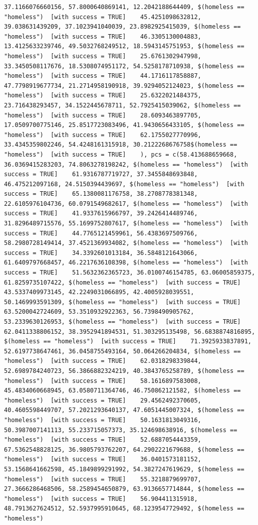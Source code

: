 \documentclass{tufte-book}\usepackage[]{graphicx}\usepackage[]{xcolor}
\makeatletter
\newenvironment{kframe}{%
 \def\at@end@of@kframe{}%
 \ifinner\ifhmode%
  \def\at@end@of@kframe{\end{minipage}}%
  \begin{minipage}{\columnwidth}%
 \fi\fi%
 \def\FrameCommand##1{\hskip\@totalleftmargin \hskip-\fboxsep
 \colorbox{shadecolor}{##1}\hskip-\fboxsep
     \hskip-\linewidth \hskip-\@totalleftmargin \hskip\columnwidth}%
 \MakeFramed {\advance\hsize-\width
   \@totalleftmargin\z@ \linewidth\hsize
   \@setminipage}}%
 {\par\unskip\endMakeFramed%
 \at@end@of@kframe}
\newenvironment{knitrout}{}{} %
\makeatother
\begin{document}
\begin{knitrout}
\begin{kframe}
\begin{verbatim}
37.1166076660156, 57.8000640869141, 12.2042188644409, $(homeless == "homeless")  [with success = TRUE]    45.4251098632812, 39.038631439209, 37.1023941040039, 23.8982925415039, $(homeless == "homeless")  [with success = TRUE]    46.3305130004883, 13.4125633239746, 49.5032768249512, 18.5943145751953, $(homeless == "homeless")  [with success = TRUE]    25.6761302947998, 33.3450508117676, 18.5308074951172, 54.5258178710938, $(homeless == "homeless")  [with success = TRUE]    44.1716117858887, 47.7798919677734, 21.2714958190918, 39.9294052124023, $(homeless == "homeless")  [with success = TRUE]    25.6322021484375, 23.716438293457, 34.1522445678711, 52.7925415039062, $(homeless == "homeless")  [with success = TRUE]    28.6093463897705, 17.0509700775146, 25.8517723083496, 41.9430656433105, $(homeless == "homeless")  [with success = TRUE]    62.1755027770996, 33.4345359802246, 54.4248161315918, 30.2122268676758$(homeless == "homeless")  [with success = TRUE]    ), pcs = c(58.413688659668, 36.0369415283203, 74.8063278198242, $(homeless == "homeless")  [with success = TRUE]    61.9316787719727, 37.3455848693848, 46.475212097168, 24.5150394439697, $(homeless == "homeless")  [with success = TRUE]    65.1380081176758, 38.2708778381348, 22.6105976104736, 60.0791549682617, $(homeless == "homeless")  [with success = TRUE]    41.9337615966797, 39.2426414489746, 31.8296489715576, 55.1699752807617, $(homeless == "homeless")  [with success = TRUE]    44.7765121459961, 56.4383697509766, 58.2980728149414, 37.4521369934082, $(homeless == "homeless")  [with success = TRUE]    34.3392601013184, 36.5848121643066, 61.6409797668457, 46.2217636108398, $(homeless == "homeless")  [with success = TRUE]    51.5632362365723, 36.0100746154785, 63.06005859375, 61.8259735107422, $(homeless == "homeless")  [with success = TRUE]    43.5337409973145, 42.2249031066895, 42.4005928039551, 50.1469993591309, $(homeless == "homeless")  [with success = TRUE]    63.5200042724609, 53.3510932922363, 56.7398490905762, 53.2339630126953, $(homeless == "homeless")  [with success = TRUE]    62.0411338806152, 38.3952941894531, 51.303295135498, 56.6838874816895, $(homeless == "homeless")  [with success = TRUE]    71.3925933837891, 52.6197738647461, 36.0458755493164, 50.064266204834, $(homeless == "homeless")  [with success = TRUE]    62.0318298339844, 52.6989784240723, 56.3866882324219, 40.3843765258789, $(homeless == "homeless")  [with success = TRUE]    58.1616897583008, 45.4834060668945, 63.0580711364746, 46.750862121582, $(homeless == "homeless")  [with success = TRUE]    29.4562492370605, 40.4605598449707, 57.2021293640137, 47.6051445007324, $(homeless == "homeless")  [with success = TRUE]    50.1631813049316, 50.3987007141113, 55.233715057373, 35.124698638916, $(homeless == "homeless")  [with success = TRUE]    52.6887054443359, 67.5362548828125, 36.9805793762207, 64.2902221679688, $(homeless == "homeless")  [with success = TRUE]    36.0401573181152, 53.1568641662598, 45.1849899291992, 54.3827247619629, $(homeless == "homeless")  [with success = TRUE]    55.3218879699707, 27.3666286468506, 58.2589454650879, 63.9136657714844, $(homeless == "homeless")  [with success = TRUE]    56.904411315918, 48.7913627624512, 52.5937995910645, 68.1239547729492, $(homeless == "homeless")  
\end{verbatim}
\end{kframe}
\end{knitrout}
\end{document}

